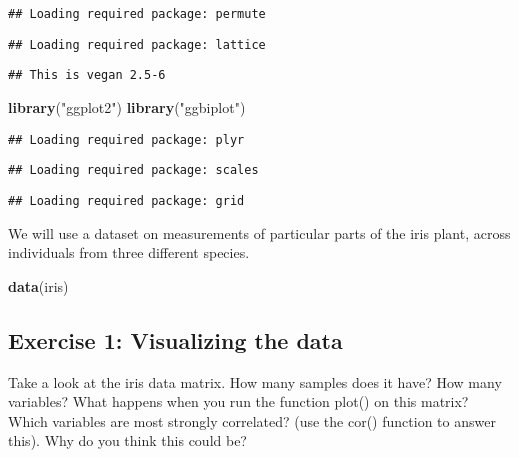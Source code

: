 \documentclass[
]{book}
\newenvironment{Shaded}{\begin{snugshade}}{\end{snugshade}}
\newcommand{\KeywordTok}[1]{\textcolor[rgb]{0.13,0.29,0.53}{\textbf{#1}}}
\newcommand{\NormalTok}[1]{#1}
\newcommand{\StringTok}[1]{\textcolor[rgb]{0.31,0.60,0.02}{#1}}
\begin{document}
\begin{verbatim}
## Loading required package: permute
\end{verbatim}

\begin{verbatim}
## Loading required package: lattice
\end{verbatim}

\begin{verbatim}
## This is vegan 2.5-6
\end{verbatim}

\begin{Shaded}
\begin{Highlighting}[]
\KeywordTok{library}\NormalTok{(}\StringTok{"ggplot2"}\NormalTok{)}
\KeywordTok{library}\NormalTok{(}\StringTok{"ggbiplot"}\NormalTok{)}
\end{Highlighting}
\end{Shaded}

\begin{verbatim}
## Loading required package: plyr
\end{verbatim}

\begin{verbatim}
## Loading required package: scales
\end{verbatim}

\begin{verbatim}
## Loading required package: grid
\end{verbatim}

We will use a dataset on measurements of particular parts of the iris plant, across individuals from three different species.

\begin{Shaded}
\begin{Highlighting}[]
\KeywordTok{data}\NormalTok{(iris)}
\end{Highlighting}
\end{Shaded}

\hypertarget{exercise-1-visualizing-the-data}{%
\subsection{Exercise 1: Visualizing the data}\label{exercise-1-visualizing-the-data}}

Take a look at the iris data matrix. How many samples does it have? How many variables? What happens when you run the function plot() on this matrix? Which variables are most strongly correlated? (use the cor() function to answer this). Why do you think this could be?
\end{document}
